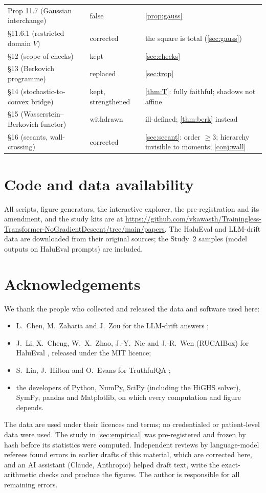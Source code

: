 \documentclass[11pt]{article}
\theoremstyle{definition}
\begin{document}
\begin{longtable}{>{\raggedright}p{4.4cm}>{\raggedright}p{2.2cm}>{\raggedright\arraybackslash}p{7.8cm}}
Prop 11.7 (Gaussian interchange) & false & \cref{prop:gauss}\\
\S11.6.1 (restricted domain $V$) & corrected & the square is total (\cref{sec:gauss})\\
\S12 (scope of checks) & kept & \cref{sec:checks}\\
\S13 (Berkovich programme) & replaced & \cref{sec:trop}\\
\S14 (stochastic-to-convex bridge) & kept, strengthened & \cref{thm:T}: fully faithful; shadows not affine\\
\S15 (Wasserstein--Berkovich functor) & withdrawn & ill-defined; \cref{thm:berk} instead\\
\S16 (secants, wall-crossing) & corrected & \cref{sec:secant}: order $\ge3$; hierarchy invisible to moments; \cref{conj:wall}\\
\bottomrule
\end{longtable}

\section*{Code and data availability}
All scripts, figure generators, the interactive explorer, the pre-registration and its amendment, and the study kits are at
\url{https://github.com/vkawasth/Trainingless-Transformer-NoGradientDescent/tree/main/papers}. The HaluEval and LLM-drift data are
downloaded from their original sources; the Study~2 samples (model outputs on HaluEval prompts) are included.

\section*{Acknowledgements}
We thank the people who collected and released the data and software used here:
\begin{itemize}[leftmargin=*,nosep]
\item L.~Chen, M.~Zaharia and J.~Zou for the LLM-drift answers \cite{ChenZaharia2024};
\item J.~Li, X.~Cheng, W.~X.~Zhao, J.-Y.~Nie and J.-R.~Wen (RUCAIBox) for HaluEval \cite{Li2023HaluEval}, released under the MIT licence;
\item S.~Lin, J.~Hilton and O.~Evans for TruthfulQA \cite{Lin2022TruthfulQA};
\item the developers of Python, NumPy, SciPy (including the HiGHS solver), SymPy, pandas and Matplotlib, on which every computation and
  figure depends.
\end{itemize}
The data are used under their licences and terms; no credentialed or patient-level data were used. The study in \cref{sec:empirical}
was pre-registered and frozen by hash before its statistics were computed. Independent reviews by language-model referees found errors
in earlier drafts of this material, which are corrected here, and an AI assistant (Claude, Anthropic) helped draft text, write the
exact-arithmetic checks and produce the figures. The author is responsible for all remaining errors.
\end{document}
